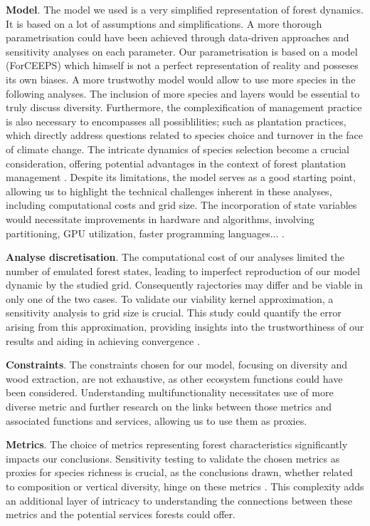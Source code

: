 \documentclass{article}
\begin{document}
\textbf{Model}. The model we used is a very simplified representation of forest dynamics. It is based on a lot of assumptions and simplifications. A more  thorough parametrisation could have been achieved through data-driven approaches and sensitivity analyses on each parameter. Our parametrisation is based on a model (ForCEEPS) which himself is not a perfect representation of reality and posseses its own biases. A  more trustwothy model would allow to use more species in the following analyses. The inclusion of more species and layers would be essential to truly discuss diversity. Furthermore, the complexification of management practice is also necessary to encompasses all possiblilities; such as plantation practices, which directly address questions related to species choice and turnover in the face of climate change. The intricate dynamics of species selection become a crucial consideration, offering potential advantages in the context of forest plantation management \autocite{brockerhoffPlantationForestsBiodiversity2008}. Despite its limitations, the model serves as a good starting point, allowing us to highlight the technical challenges inherent in these analyses, including computational costs and grid size. The incorporation of state variables would necessitate improvements in hardware and algorithms, involving partitioning, GPU utilization, faster programming languages... \autocite{briasAcceleratingViabilityKernel2016}.

\textbf{Analyse discretisation}. The computational cost of our analyses limited the number of emulated forest states, leading to imperfect reproduction of our model dynamic by the studied grid. Consequently rajectories may differ and be viable in only one of the two cases. To validate our viability kernel approximation, a sensitivity analysis to grid size is crucial. This study could quantify the error arising from this approximation, providing insights into the trustworthiness of our results and aiding in achieving convergence \autocite{saint-pierreApproximationViabilityKernel1994}.

\textbf{Constraints}. The constraints chosen for our model, focusing on diversity and wood extraction, are not exhaustive, as other ecosystem functions could have been considered. Understanding multifunctionality necessitates use of more diverse metric and further research on the links between those metrics and associated functions and services, allowing us to use them as proxies.

\textbf{Metrics}. The choice of metrics representing forest characteristics significantly impacts our conclusions. Sensitivity testing to validate the chosen metrics as proxies for species richness is crucial, as the conclusions drawn, whether related to composition or vertical diversity, hinge on these metrics \autocite{juckerClimateModulatesEffects2016, guldinRoleUnevenAgedSilviculture1996, noletComparingEffectsEven2018}. This complexity adds an additional layer of intricacy to understanding the connections between these metrics and the potential services forests could offer.
\end{document}
